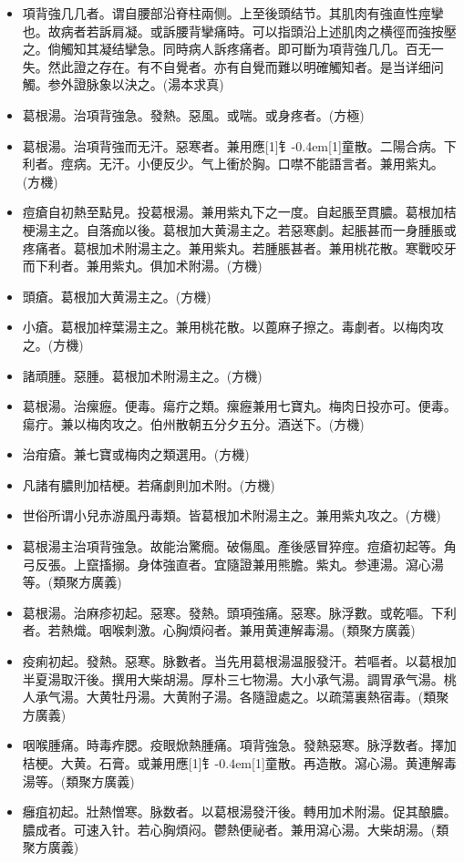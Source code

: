 \documentclass[oneside,b4paper]{ctexbook}
\begin{document}
\begin{flushleft}
\begin{itemize}
\item 項背強几几者。谓自腰部沿脊柱兩侧。上至後頭结节。其肌肉有強直性痙攣也。故病者若訴肩凝。或訴腰背攣痛時。可以指頭沿上述肌肉之横徑而強按壓之。倘觸知其凝结攣急。同時病人訴疼痛者。即可斷为項背強几几。百无一失。然此證之存在。有不自覺者。亦有自覺而難以明確觸知者。是当详细问觸。参外證脉象以決之。(湯本求真)
\item 葛根湯。治項背強急。發熱。惡風。或喘。或身疼者。(方極)
\item 葛根湯。治項背強而无汗。惡寒者。兼用應{\hbox{\scalebox{0.7}[1]{钅}\kern-0.4em\scalebox{0.7}[1]{童}}}散。二陽合病。下利者。痙病。无汗。小便反少。气上衝於胸。口噤不能語言者。兼用紫丸。(方機)
\item 痘瘡自初熱至點見。投葛根湯。兼用紫丸下之一度。自起脹至貫膿。葛根加桔梗湯主之。自落痂以後。葛根加大黄湯主之。若惡寒劇。起脹甚而一身腫脹或疼痛者。葛根加术附湯主之。兼用紫丸。若腫脹甚者。兼用桃花散。寒戰咬牙而下利者。兼用紫丸。俱加术附湯。(方機)
\item 頭瘡。葛根加大黄湯主之。(方機)
\item 小瘡。葛根加梓葉湯主之。兼用桃花散。以蓖麻子擦之。毒劇者。以梅肉攻之。(方機)
\item 諸頑腫。惡腫。葛根加术附湯主之。(方機)
\item 葛根湯。治瘰癧。便毒。瘍疔之類。瘰癧兼用七寶丸。梅肉日投亦可。便毒。瘍疔。兼以梅肉攻之。伯州散朝五分夕五分。酒送下。(方機)
\item 治疳瘡。兼七寶或梅肉之類選用。(方機)
\item 凡諸有膿則加桔梗。若痛劇則加术附。(方機)
\item 世俗所谓小兒赤游風丹毒類。皆葛根加术附湯主之。兼用紫丸攻之。(方機)
\item 葛根湯主治項背強急。故能治驚癇。破傷風。產後感冒猝痙。痘瘡初起等。角弓反張。上竄搐搦。身体強直者。宜隨證兼用熊膽。紫丸。参連湯。瀉心湯等。(類聚方廣義)
\item 葛根湯。治麻疹初起。惡寒。發熱。頭項強痛。惡寒。脉浮數。或乾嘔。下利者。若熱熾。咽喉刺激。心胸煩闷者。兼用黄連解毒湯。(類聚方廣義)
\item 疫痢初起。發熱。惡寒。脉數者。当先用葛根湯温服發汗。若嘔者。以葛根加半夏湯取汗後。撰用大柴胡湯。厚朴三七物湯。大小承气湯。調胃承气湯。桃人承气湯。大黄牡丹湯。大黄附子湯。各隨證處之。以疏蕩裏熱宿毒。(類聚方廣義)
\item 咽喉腫痛。時毒痄腮。疫眼焮熱腫痛。項背強急。發熱惡寒。脉浮数者。擇加桔梗。大黄。石膏。或兼用應{\hbox{\scalebox{0.7}[1]{钅}\kern-0.4em\scalebox{0.7}[1]{童}}}散。再造散。瀉心湯。黄連解毒湯等。(類聚方廣義)
\item 癰疽初起。壯熱憎寒。脉数者。以葛根湯發汗後。轉用加术附湯。促其酿膿。膿成者。可速入针。若心胸煩闷。鬱熱便祕者。兼用瀉心湯。大柴胡湯。(類聚方廣義)
\end{itemize}


\end{flushleft}
\end{document}

